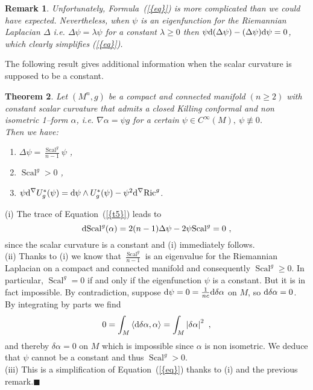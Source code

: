 \documentclass[a4paper,11pt,leqno]{amsart}
\numberwithin{equation}{section}
\theoremstyle{main}
\newtheorem{thm} {\bf  Theorem} [section]
\newtheorem{Rq}[thm]{\bf  Remark }
\begin{document}
\begin{Rq} Unfortunately, Formula~({\ref{{eq}}}) is more complicated than we could have expected.  Nevertheless, when $\psi$ is an eigenfunction for the Riemannian Laplacian $\Delta$ i.e. $\Delta \psi= \lambda \psi$ for a constant $\lambda\ge 0$ then $\psi{{\rm d}} (\Delta \psi) - (\Delta \psi) {{\rm d}} \psi= 0 $, which clearly simplifies ({\ref{{eq}}}).
\end{Rq}
 
The following result gives additional information when the scalar curvature is supposed to be a constant.

\begin{thm}\label{main}
Let $(M^n, g)$ be a compact and connected manifold $(n\ge 2)$ with constant scalar curvature that admits a closed Killing conformal and non isometric 1--form $\alpha$, i.e. ${\nabla \alpha= \psi g} $ for a certain $\psi\in C^{\infty}(M),\ \psi \not\equiv 0$. \\
Then we have:
\begin{enumerate}
	\item $\Delta \psi = \frac{{\operatorname{Scal}}^g}{n-1}\psi$ , 
	\item ${\operatorname{Scal}}^g >0$ ,
	\item $\psi{{\rm d}} ^\nabla U_g^* (\psi) = {{\rm d}} \psi \wedge U_g^*(\psi) -\psi^2 {{\rm d}} ^\nabla{\operatorname{Ric}}^g$.
\end{enumerate}
\end{thm}
\proof (i) The trace of Equation~({\ref{{t5}}}) leads to 
$$ {{\rm d}} {\operatorname{Scal}}^g(\alpha)=2(n-1) \Delta \psi -2\psi{\operatorname{Scal}}^g=0 \ ,$$
since the scalar curvature is a constant and (i) immediately follows.\\
(ii) Thanks to (i) we know that $\frac{{\operatorname{Scal}}^g}{n-1}$ is an eigenvalue for the Riemannian Laplacian on a compact and connected manifold and consequently ${\operatorname{Scal}}^g\ge 0$. In particular, ${\operatorname{Scal}}^g=0$ if and only if the eigenfunction $\psi$ is a constant. But it is in fact impossible. By contradiction, suppose ${{\rm d}}\psi=0=\frac{1}{nc}{{\rm d}} \delta \alpha$ on $M$, so ${{\rm d}} \delta \alpha=0$. By integrating by parts we find 
$$0=\int_{M}\left\langle{{\rm d}} \delta \alpha,\alpha \right\rangle=\int_{M}\left|\delta\alpha\right|^{2} \ , $$
and thereby $\delta\alpha=0$ on $M$ which is impossible since $\alpha$ is non isometric. We deduce that $\psi$ cannot be a constant and thus ${\operatorname{Scal}}^g>0$.\\
(iii) This is a simplification of Equation~({\ref{{eq}}}) thanks to (i) and the previous remark.{\hfill $\blacksquare$ \medskip \\}
\end{document}
